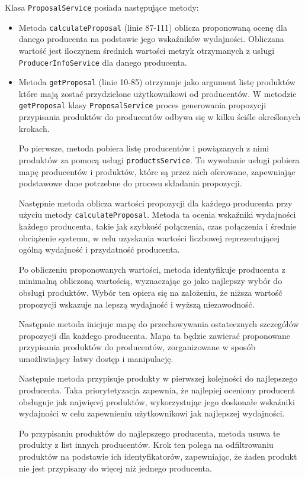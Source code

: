 Klasa \verb|ProposalService| posiada następujące metody:
\begin{itemize}
    \item Metoda \verb|calculateProposal| (linie 87-111) oblicza proponowaną ocenę dla danego producenta na podstawie jego wskaźników wydajności. Obliczana wartość jest iloczynem średnich wartości metryk otrzymanych z usługi \verb|ProducerInfoService| dla danego producenta.
    \item Metoda \verb|getProposal| (linie 10-85) otrzymuje jako argument listę produktów które mają zostać przydzielone użytkownikowi od producentów. W metodzie \verb|getProposal| klasy \verb|ProposalService| proces generowania propozycji przypisania produktów do producentów odbywa się w kilku ściśle określonych krokach. 

    Po pierwsze, metoda pobiera listę producentów i powiązanych z nimi produktów za pomocą usługi \verb|productsService|. To wywołanie usługi pobiera mapę producentów i produktów, które są przez nich oferowane, zapewniając podstawowe dane potrzebne do procesu składania propozycji.

    Następnie metoda oblicza wartości propozycji dla każdego producenta przy użyciu metody \verb|calculateProposal|. Metoda ta ocenia wskaźniki wydajności każdego producenta, takie jak szybkość połączenia, czas połączenia i średnie obciążenie systemu, w celu uzyskania wartości liczbowej reprezentującej ogólną wydajność i przydatność producenta.

    Po obliczeniu proponowanych wartości, metoda identyfikuje producenta z minimalną obliczoną wartością, wyznaczając go jako najlepszy wybór do obsługi produktów. Wybór ten opiera się na założeniu, że niższa wartość propozycji wskazuje na lepszą wydajność i wyższą niezawodność.

    Następnie metoda inicjuje mapę do przechowywania ostatecznych szczegółów propozycji dla każdego producenta. Mapa ta będzie zawierać proponowane przypisania produktów do producentów, zorganizowane w sposób umożliwiający łatwy dostęp i manipulację.

    Następnie metoda przypisuje produkty w pierwszej kolejności do najlepszego producenta. Taka priorytetyzacja zapewnia, że najlepiej oceniony producent obsługuje jak najwięcej produktów, wykorzystując jego doskonałe wskaźniki wydajności w celu zapewnieniu użytkownikowi jak najlepszej wydajności.

    Po przypisaniu produktów do najlepszego producenta, metoda usuwa te produkty z list innych producentów. Krok ten polega na odfiltrowaniu produktów na podstawie ich identyfikatorów, zapewniając, że żaden produkt nie jest przypisany do więcej niż jednego producenta.


\end{itemize}
